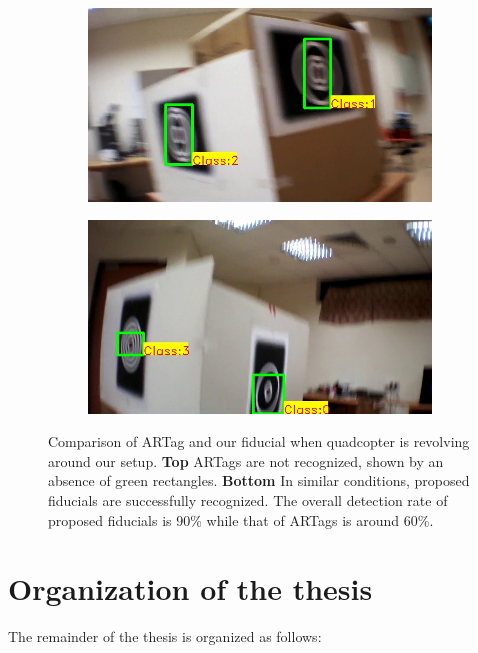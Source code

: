 \begin{figure}
\begin{subfigure}[b]{0.24\textwidth}
\end{subfigure}
\begin{subfigure}[b]{0.24\textwidth}
\includegraphics[width=\linewidth]{figures/fiducial/setup_our/output_2/output_35.jpg}
\end{subfigure}
\begin{subfigure}[b]{0.24\textwidth}
\includegraphics[width=\linewidth]{figures/fiducial/setup_our/output_6/output_943.jpg}
\end{subfigure}
\caption[Comparison of ARTag and our fiducial when quadcopter is
  revolving around our setup]{Comparison of ARTag and our fiducial when quadcopter is
  revolving around our setup. 
\textbf{Top} ARTags are not recognized, shown by an absence of green rectangles.
\textbf{Bottom} In similar conditions, proposed fiducials are successfully
recognized. The overall detection rate of proposed fiducials is 90\% while that
of ARTags is around 60\%. }
\label{fig:fiducials_result}
\end{figure}
	
\section{Organization of the thesis}
The remainder of the thesis is organized as follows:\\

